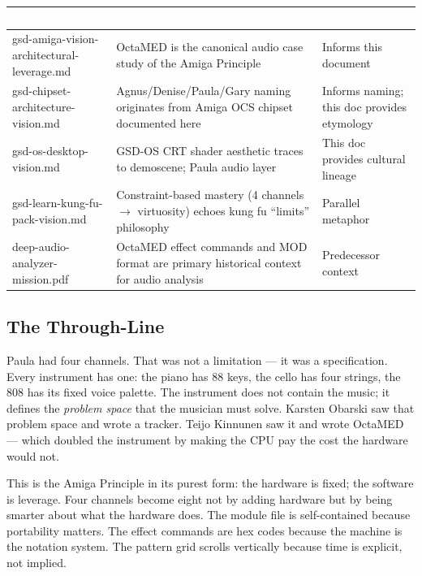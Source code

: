 \documentclass[11pt,letterpaper]{article}
\newcommand{\tableheader}[1]{\textbf{\sffamily\textcolor{white}{#1}}}
\begin{document}
\begin{center}
\begin{tabularx}{\textwidth}{L{4.5cm}L{5cm}L{4cm}}
\toprule
{}
\tableheader{Document} & \tableheader{Relationship} & \tableheader{Direction} \\
\midrule
gsd-amiga-vision-architectural-leverage.md & OctaMED is the canonical audio case study of the Amiga Principle & Informs this document \\
gsd-chipset-architecture-vision.md & Agnus/Denise/Paula/Gary naming originates from Amiga OCS chipset documented here & Informs naming; this doc provides etymology \\
gsd-os-desktop-vision.md & GSD-OS CRT shader aesthetic traces to demoscene; Paula audio layer & This doc provides cultural lineage \\
gsd-learn-kung-fu-pack-vision.md & Constraint-based mastery (4 channels $\to$ virtuosity) echoes kung fu ``limits'' philosophy & Parallel metaphor \\
deep-audio-analyzer-mission.pdf & OctaMED effect commands and MOD format are primary historical context for audio analysis & Predecessor context \\
\bottomrule
\end{tabularx}
\end{center}

\subsection{The Through-Line}

Paula had four channels. That was not a limitation --- it was a specification. Every instrument has one: the piano has 88 keys, the cello has four strings, the 808 has its fixed voice palette. The instrument does not contain the music; it defines the \textit{problem space} that the musician must solve. Karsten Obarski saw that problem space and wrote a tracker. Teijo Kinnunen saw it and wrote OctaMED --- which doubled the instrument by making the CPU pay the cost the hardware would not.

This is the Amiga Principle in its purest form: the hardware is fixed; the software is leverage. Four channels become eight not by adding hardware but by being smarter about what the hardware does. The module file is self-contained because portability matters. The effect commands are hex codes because the machine is the notation system. The pattern grid scrolls vertically because time is explicit, not implied.
\end{document}
